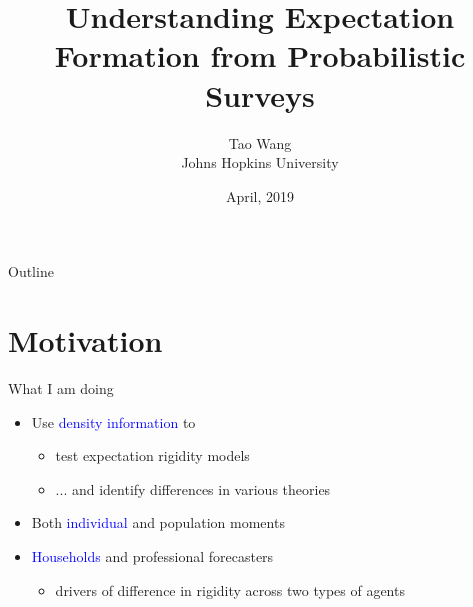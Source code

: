 \documentclass{beamer}
\title{Understanding Expectation Formation from Probabilistic Surveys}
\author{Tao Wang \\ Johns Hopkins University}
\date{April, 2019}
\begin{document}
	
	
\begin{frame}
	\titlepage
\end{frame}
\begin{frame}{Outline}
	\tableofcontents
\end{frame}

\section{Motivation}



\begin{frame}{What I am doing}
\begin{itemize}
	\item Use \textcolor{blue}{density information} to 
	\begin{itemize}
		\item test expectation rigidity models 
		\item ... and identify differences in various theories 
	\end{itemize}
	\item Both \textcolor{blue}{individual} and population moments 
	\item \textcolor{blue}{Households} and professional forecasters 
	\begin{itemize}
		\item drivers of difference in rigidity across two types of agents
	\end{itemize}
\end{itemize}
\end{frame}
\end{document}
